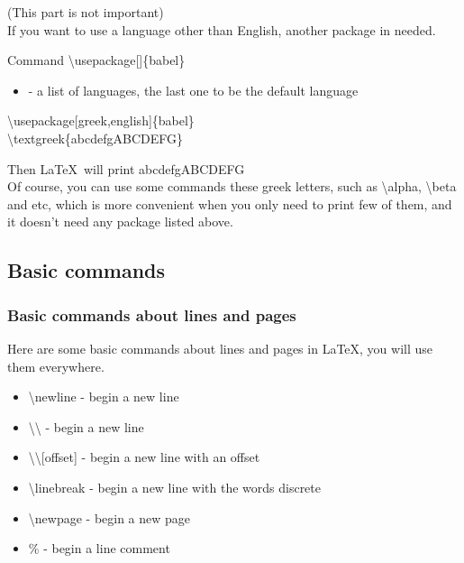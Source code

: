 \documentclass{beamer}
\newenvironment{command}{\begin{block}{Command}}{\end{block}}
\begin{document}
\begin{frame}
	(This part is not important)\\
	If you want to use a language other than English, another package  in needed.
	\begin{command}
		\alert{\textbackslash usepackage}[]\{babel\}
		\begin{itemize}
			\item {} - a list of languages, the last one to be the default language
		\end{itemize}
	\end{command}
	\begin{example}
		\alert{\textbackslash usepackage}[greek,english]\{babel\}\\
		\alert{\textbackslash textgreek}\{abcdefgABCDEFG\}\\
	\end{example}
	Then \LaTeX\ will print \textgreek{abcdefgABCDEFG}\\
	Of course, you can use some commands these greek letters, such as \alert{\textbackslash alpha}, \alert{\textbackslash beta} and etc, which is more convenient when you only need to print few of them, and it doesn't need any package listed above.
\end{frame}

\subsection{Basic commands}

\begin{frame}
	\frametitle{Basic commands about lines and pages}
	Here are some basic commands about lines and pages in \LaTeX, you will use them everywhere.
	\begin{itemize}
		\item \alert{\textbackslash newline} - begin a new line
		\item \alert{\textbackslash\textbackslash} - begin a new line
		\item \alert{\textbackslash\textbackslash[offset]} - begin a new line with an offset
		\item \alert{\textbackslash linebreak} - begin a new line with the words discrete
		\item \alert{\textbackslash newpage} - begin a new page
		\item \alert{\%} - begin a line comment
	\end{itemize}
\end{frame}
\end{document}

